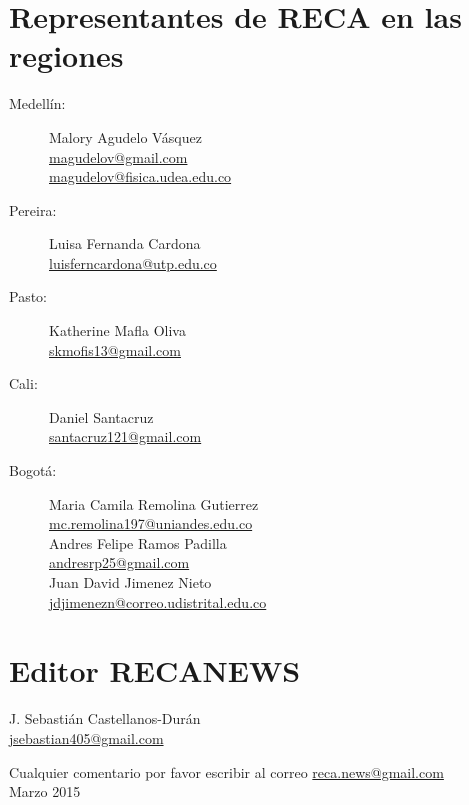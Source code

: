 \documentclass{book}
\begin{document}
\section*{Representantes de RECA en las regiones}
\begin{description}
\item[Medellín:]Malory Agudelo Vásquez\\
\url{magudelov@gmail.com}\\ \url{magudelov@fisica.udea.edu.co}
\item[Pereira:]Luisa Fernanda Cardona\\ \url{luisferncardona@utp.edu.co}
\item[Pasto:]Katherine Mafla Oliva\\
\url{skmofis13@gmail.com}
\item[Cali:]Daniel Santacruz\\
\url{santacruz121@gmail.com}
\item[Bogotá:]Maria Camila Remolina Gutierrez\\
\url{mc.remolina197@uniandes.edu.co}\\

Andres Felipe Ramos Padilla\\
\url{andresrp25@gmail.com}\\

Juan David Jimenez Nieto\\
\url{jdjimenezn@correo.udistrital.edu.co}
\end{description}


			\section*{Editor RECANEWS}
  
\begin{flushright}
J. Sebastián Castellanos-Durán\\
\url{jsebastian405@gmail.com}
\end{flushright}
\begin{flushright}
Cualquier comentario por favor escribir al correo  \url{reca.news@gmail.com}\\
Marzo 2015
\end{flushright}
\end{document}
